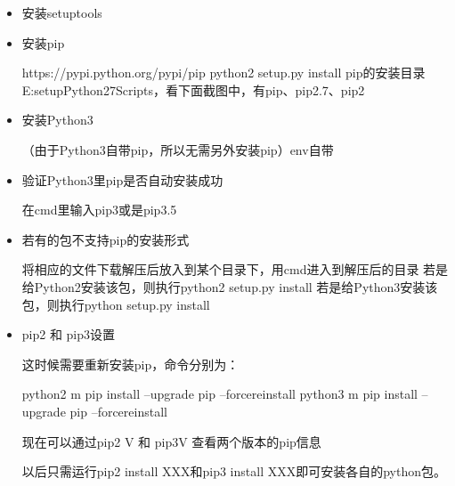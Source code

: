 \documentclass[letterpaper,12pt,english]{sphinxmanual}
\begin{document}
\begin{itemize}
\item {} 
安装setuptools

\begin{sphinxVerbatim}[commandchars=\\\{\}]
  
\end{sphinxVerbatim}

\item {} 
安装pip

\begin{sphinxVerbatim}[commandchars=\\\{\}]
https://pypi.python.org/pypi/pip
python2 setup.py install
pip的安装目录E:\PYGZbs{}setup\PYGZbs{}Python27\PYGZbs{}Scripts，看下面截图中，有pip、pip2.7、pip2
\end{sphinxVerbatim}

\item {} 
安装Python3

（由于Python3自带pip，所以无需另外安装pip）env自带

\item {} 
验证Python3里pip是否自动安装成功

在cmd里输入pip3或是pip3.5

\item {} 
若有的包不支持pip的安装形式

\begin{sphinxVerbatim}[commandchars=\\\{\}]
将相应的文件下载解压后放入到某个目录下，用cmd进入到解压后的目录
若是给Python2安装该包，则执行python2 setup.py install
若是给Python3安装该包，则执行python setup.py install
\end{sphinxVerbatim}

\item {} 
pip2 和 pip3设置

这时候需要重新安装pip，命令分别为：

\begin{sphinxVerbatim}[commandchars=\\\{\}]
python2 \PYGZhy{}m pip install –upgrade pip –force\PYGZhy{}reinstall
python3 \PYGZhy{}m pip install –upgrade pip –force\PYGZhy{}reinstall
\end{sphinxVerbatim}

现在可以通过pip2 \sphinxhyphen{}V 和 pip3\sphinxhyphen{}V 查看两个版本的pip信息

以后只需运行pip2 install XXX和pip3 install
XXX即可安装各自的python包。

\end{itemize}
\end{document}
